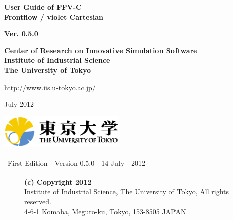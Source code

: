 \documentclass[a4paper,10pt,oneside,fleqn]{jsbook}
\begin{document}
\begin{titlepage}
\begin{center}
\vspace*{3cm}
{\huge \textbf{User Guide of FFV-C}}\\
\vspace{0.2cm}
{\huge \textbf{Frontflow / violet Cartesian}}\\
\vspace{1cm}

{\large \textbf{Ver. 0.5.0}}\\
\vspace{1.5cm}

{\large \textbf{Center of Research on Innovative Simulation Software}\\
\vspace{0.1cm}
\large \textbf{Institute of Industrial Science}\\
\large \textbf{The University of Tokyo}\\
\vspace{1cm}
}


\url{http://www.iis.u-tokyo.ac.jp/}\\
\vspace{1cm}

July 2012\\
\vspace{4cm}

\includegraphics[width=6cm]{UT.eps}

\end{center}
\end{titlepage}
\newpage

%
\frontmatter

\begin{tabular}{llllr}
First Edition  &  Version 0.5.0  &  14 July  & 2012
               

\end{tabular}

\vspace{15cm}

\begin{description}
\item[ ] \textbf{(c) Copyright 2012}\\
Institute of Industrial Science, The University of Tokyo, All rights reserved.\\
4-6-1 Komaba, Meguro-ku, Tokyo, 153-8505 JAPAN\\
\end{description}
\end{document}
